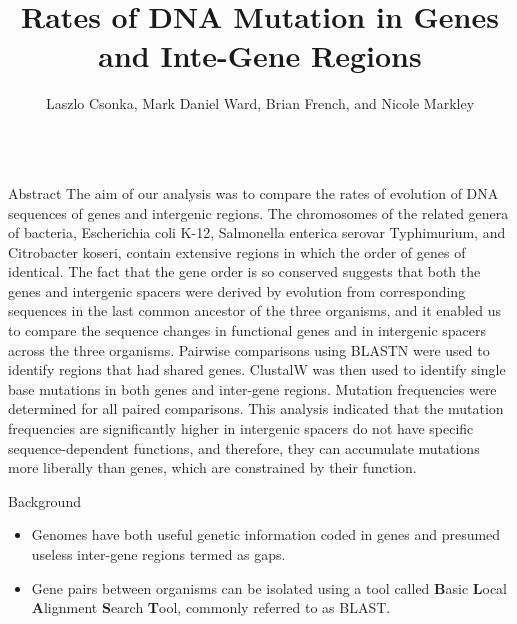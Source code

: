 \documentclass[final]{beamer}
\title[Fancy Posters]{Rates of DNA Mutation in Genes and Inte-Gene Regions}
\author{Laszlo Csonka, Mark Daniel Ward, Brian French, and Nicole Markley}
\institute{Department of Biology, Purdue University, West Lafayette, IN}
\begin{document}
  \begin{frame}{}
    \begin{columns}[t]


    \begin{column}{.32 \linewidth}
    \begin{block}{\large Abstract}
The aim of our analysis was to compare the rates of evolution of DNA sequences of genes and intergenic regions. The chromosomes of the related genera of bacteria, Escherichia coli K-12, Salmonella enterica serovar Typhimurium, and Citrobacter koseri, contain extensive regions in which the order of genes of identical. The fact that the gene order is so conserved suggests that both the genes and intergenic spacers were derived by evolution from corresponding sequences in the last common ancestor of the three organisms, and it enabled us to compare the sequence changes in functional genes and in intergenic spacers across the three organisms.
\newline
\newline
Pairwise comparisons using BLASTN were used to identify regions that had shared genes. ClustalW was then used to identify single base mutations in both genes and inter-gene regions. Mutation frequencies were determined for all paired comparisons. This analysis indicated that the mutation frequencies are significantly higher in intergenic spacers do not have specific sequence-dependent functions, and therefore, they can accumulate mutations more liberally than genes, which are constrained by their function.
    \end{block}

\begin{block}{\large Background}
\begin{itemize}
\item Genomes have both useful genetic information coded in genes and presumed useless inter-gene regions termed as gaps.
\item Gene pairs between organisms can be isolated using a tool called \textbf{B}asic \textbf{L}ocal \textbf{A}lignment \textbf{S}earch \textbf{T}ool, commonly referred to as BLAST. 


\end{itemize}
\end{block}
\end{column}
\end{columns}
\end{frame}
\end{document}
